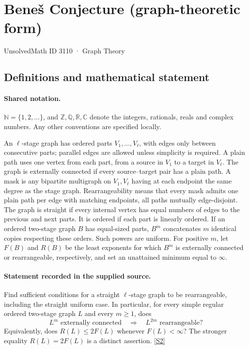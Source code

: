 \documentclass[11pt]{book}
\newcommand{\sref}[2]{\hyperlink{source:#1:#2}{[S#2]}}
\begin{document}
\setcounter{section}{3109}
\section{Beneš Conjecture (graph-theoretic form)}\label{3110}
{\small\sffamily UnsolvedMath ID 3110 · Graph Theory}
\subsection{Definitions and mathematical statement}

\paragraph{Shared notation.}$\mathbb N=\{1,2,\ldots\}$, and $\mathbb Z,\mathbb Q,\mathbb R,\mathbb C$ denote the integers, rationals, reals and complex numbers. Any other conventions are specified locally.


An $\ell$-stage graph has ordered parts $V_1,\ldots,V_\ell$, with edges only between consecutive parts; parallel edges are allowed unless simplicity is required. A plain path uses one vertex from each part, from a source in $V_1$ to a target in $V_\ell$. The graph is externally connected if every source--target pair has a plain path. A mask is any bipartite multigraph on $V_1,V_\ell$ having at each endpoint the same degree as the stage graph. Rearrangeability means that every mask admits one plain path per edge with matching endpoints, all paths mutually edge-disjoint. The graph is straight if every internal vertex has equal numbers of edges to the previous and next parts. It is ordered if each part is linearly ordered. If an ordered two-stage graph $B$ has equal-sized parts, $B^m$ concatenates $m$ identical copies respecting these orders. Such powers are uniform. For positive $m$, let $F(B)$ and $R(B)$ be the least exponents for which $B^m$ is externally connected or rearrangeable, respectively, and set an unattained minimum equal to $\infty$.
\paragraph{Statement recorded in the supplied source.}
Find sufficient conditions for a straight $\ell$-stage graph to be rearrangeable, including the straight uniform case. In particular, for every simple regular ordered two-stage graph $L$ and every $m\geq1$, does
\[L^m\text{ externally connected}\quad\Longrightarrow\quad L^{2m}\text{ rearrangeable}?\]
Equivalently, does $R(L)\leq2F(L)$ whenever $F(L)<\infty$? The stronger equality $R(L)=2F(L)$ is a distinct assertion. \sref{3110}{2}
\end{document}
